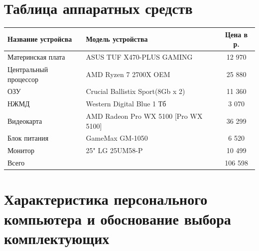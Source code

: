 \documentclass[a4paper]{article}
\begin{document}
\section{Таблица аппаратных средств}
\begin{table}[H]
\centering
\begin{tabular}{|l|l|c|}
\hline
Название устройсва & Модель устройства & Цена в р. \\
\hline
 Материнская плата     & ASUS TUF X470-PLUS GAMING & 12 970 \\
 Центральный процессор & AMD Ryzen 7 2700X OEM & 25 880 \\
 ОЗУ                   & Crucial Ballistix Sport(8Gb x 2) & 11 360 \\
 НЖМД                  & Western Digital Blue 1 Тб & 3 070 \\ 
 Видеокарта            & AMD Radeon Pro WX 5100 [Pro WX 5100] & 36 299 \\
 Блок питания          & GameMax GM-1050 & 6 520\\
 Монитор & 25" LG 25UM58-P & 10 499 \\
 \hline
 Всего  & & 106 598 \\

\hline
\end{tabular}
\end{table}

\section{Характеристика персонального компьютера и обоснование выбора комплектующих}
\end{document}
